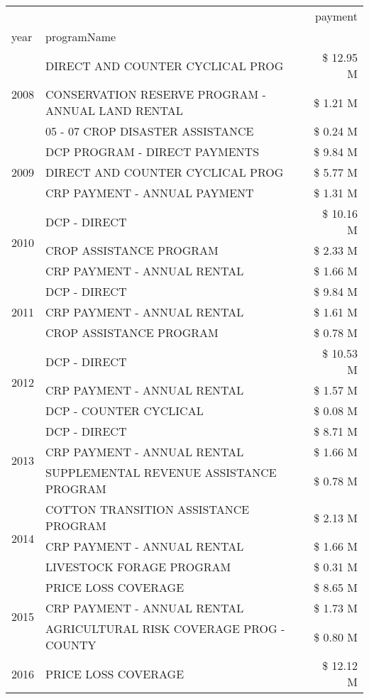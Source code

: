 \begin{tabular}{llr}
\toprule
 &  & payment \\
year & programName &  \\
\midrule
\multirow[t]{3}{*}{2008} & DIRECT AND COUNTER CYCLICAL PROG & \$ 12.95 M \\
 & CONSERVATION RESERVE PROGRAM - ANNUAL LAND RENTAL & \$ 1.21 M \\
 & 05 - 07 CROP DISASTER ASSISTANCE & \$ 0.24 M \\
\cline{1-3}
\multirow[t]{3}{*}{2009} & DCP PROGRAM - DIRECT PAYMENTS & \$ 9.84 M \\
 & DIRECT AND COUNTER CYCLICAL PROG & \$ 5.77 M \\
 & CRP PAYMENT - ANNUAL PAYMENT & \$ 1.31 M \\
\cline{1-3}
\multirow[t]{3}{*}{2010} & DCP - DIRECT & \$ 10.16 M \\
 & CROP ASSISTANCE PROGRAM & \$ 2.33 M \\
 & CRP PAYMENT - ANNUAL RENTAL & \$ 1.66 M \\
\cline{1-3}
\multirow[t]{3}{*}{2011} & DCP - DIRECT & \$ 9.84 M \\
 & CRP PAYMENT - ANNUAL RENTAL & \$ 1.61 M \\
 & CROP ASSISTANCE PROGRAM & \$ 0.78 M \\
\cline{1-3}
\multirow[t]{3}{*}{2012} & DCP - DIRECT & \$ 10.53 M \\
 & CRP PAYMENT - ANNUAL RENTAL & \$ 1.57 M \\
 & DCP - COUNTER CYCLICAL & \$ 0.08 M \\
\cline{1-3}
\multirow[t]{3}{*}{2013} & DCP - DIRECT & \$ 8.71 M \\
 & CRP PAYMENT - ANNUAL RENTAL & \$ 1.66 M \\
 & SUPPLEMENTAL REVENUE ASSISTANCE PROGRAM & \$ 0.78 M \\
\cline{1-3}
\multirow[t]{3}{*}{2014} & COTTON TRANSITION ASSISTANCE PROGRAM & \$ 2.13 M \\
 & CRP PAYMENT - ANNUAL RENTAL & \$ 1.66 M \\
 & LIVESTOCK FORAGE PROGRAM & \$ 0.31 M \\
\cline{1-3}
\multirow[t]{3}{*}{2015} & PRICE LOSS COVERAGE & \$ 8.65 M \\
 & CRP PAYMENT - ANNUAL RENTAL & \$ 1.73 M \\
 & AGRICULTURAL RISK COVERAGE PROG - COUNTY & \$ 0.80 M \\
\cline{1-3}
\multirow[t]{3}{*}{2016} & PRICE LOSS COVERAGE & \$ 12.12 M \\

\end{tabular}
